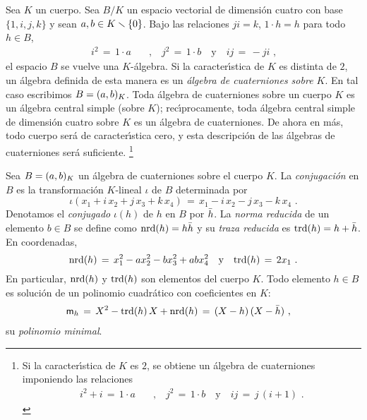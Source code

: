 Sea $K$ un cuerpo. Sea $B/K$ un espacio vectorial de dimensi\'{o}n cuatro con
base $\{1,i,j,k\}$ y sean $a,b\in K\setmin \{0\}$. Bajo las relaciones $ji=k$,
$1\cdot h=h$ para todo $h\in B$,
\begin{align*}
	i^2 \,=\,1\cdot a & \quad\text{,}\quad
		j^2 \,=\,1\cdot b\quad\text{y}\quad
		ij \,=\,-ji
	\text{ ,}
\end{align*}
%
el espacio $B$ se vuelve una $K$-\'{a}lgebra. Si la caracter\'{\i}stica de $K$
es distinta de $2$, un \'{a}lgebra definida de esta manera es un
\emph{\'{a}lgebra de cuaterniones sobre $K$}. En tal caso escribimos
$B=\varquatalg[K]{a,b}$. Toda \'{a}lgebra de cuaterniones sobre un cuerpo $K$
es un \'{a}lgebra central simple (sobre $K$); rec\'{\i}procamente, toda
\'{a}lgebra central simple de dimensi\'{o}n cuatro sobre $K$ es un \'{a}lgebra
de cuaterniones. De ahora en m\'{a}s, todo cuerpo ser\'{a} de
caracter\'{\i}stica cero, y esta descripci\'{o}n de las \'{a}lgebras de
cuaterniones ser\'{a} suficiente.%
\footnote{
	Si la caracter\'{\i}stica de $K$ es $2$, se obtiene un \'{a}lgebra de
	cuaterniones imponiendo las relaciones
	\begin{align*}
		i^2 + i\,=\, 1\cdot a & \quad\text{,}\quad
		j^2\,=\,1\cdot b \quad\text{y}\quad
		ij\,=\,j\,(i+1)
		\text{ .}
	\end{align*}
}

Sea $B=\varquatalg[K]{a,b}$ un \'{a}lgebra de cuaterniones sobre el cuerpo $K$.
La \emph{conjugaci\'{o}n} en $B$ es la transformaci\'{o}n $K$-lineal $\iota$ de
$B$ determinada por
\begin{equation}
	\label{eq:conjugacioncuaterniones}
	\iota(x_{1}+i\,x_{2}+j\,x_{3}+k\,x_{4}) \,=\,
		x_{1}-i\,x_{2}-j\,x_{3}-k\,x_{4}
	\text{ .}
\end{equation}
%
Denotamos el \emph{conjugado} $\iota(h)$ de $h$ en $B$ por $\conj{h}$. La
\emph{norma reducida} de un elemento $b\in B$ se define como
$\nrd(h)=h\conj{h}$ y su \emph{traza reducida} es $\trd(h)=h+\conj{h}$.
En coordenadas,
\begin{equation}
	\label{eq:normaytrazacuaterniones}
		\nrd(h) \,=\,x_{1}^{2}- ax_{2}^{2}-bx_{3}^{2}+abx_{4}^{2}
			\quad\text{y}\quad
		\trd(h) \,=\,2x_{1}
		\text{ .}
\end{equation}
%
En particular, $\nrd(h)$ y $\trd(h)$ son elementos del cuerpo $K$. Todo
elemento $h\in B$ es soluci\'{o}n de un polinomio cuadr\'{a}tico con
coeficientes en $K$:
\begin{align*}
	\mathsf{m}_{h} & \,=\,X^{2}-\trd(h)\,X+\nrd(h) \,=\,(X-h)\,(X-\conj{h})
	\text{ ,}
\end{align*}
%
su \emph{polinomio minimal}.

